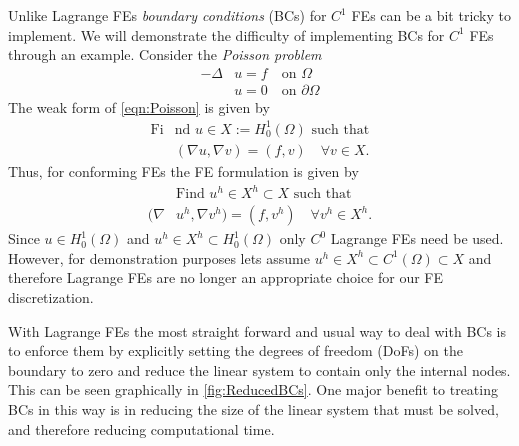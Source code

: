Unlike Lagrange FEs \emph{boundary conditions} (BCs) for $C^1$ FEs can be a bit
tricky to implement. We will demonstrate the difficulty of implementing BCs for
$C^1$ FEs through an example. Consider the \emph{Poisson problem}
\begin{equation}
  \begin{split}
    -\Delta &u = f \quad \text{on } \Omega \\
    &u = 0 \quad \text{on } \partial \Omega
  \end{split}
  \label{eqn:Poisson}
\end{equation}
The weak form of \eqref{eqn:Poisson} is given by
\begin{equation}
  \begin{split}
    \text{Fi}&\text{nd }u \in X := H^1_0(\Omega) \text{ such that} \\
    &(\nabla u, \nabla v) = (f, v) \quad \forall v \in X.
  \end{split}
  \label{eqn:PoissonWeak}
\end{equation}
Thus, for conforming FEs the FE formulation is given by
\begin{equation}
  \begin{split}
    &\text{Find }u^h \in X^h \subset X \text{ such that} \\
    (\nabla &u^h, \nabla v^h) = (f, v^h) \quad \forall v^h \in X^h.
  \end{split}
  \label{eqn:PoissonFE}
\end{equation}
Since $u \in H^1_0(\Omega)$ and $u^h \in X^h \subset H^1_0(\Omega)$ only $C^0$
Lagrange FEs need be used. However, for demonstration purposes lets assume $u^h
\in X^h \subset C^1(\Omega) \subset X$ and therefore Lagrange FEs are no longer
an appropriate choice for our FE discretization.

With Lagrange FEs the most straight forward and usual way to deal with BCs is to
enforce them by explicitly setting the degrees of freedom (DoFs) on the boundary
to zero and reduce the linear system to contain only the internal nodes. This
can be seen graphically in \autoref{fig:ReducedBCs}. One major benefit to
treating BCs in this way is in reducing the size of the linear system that must
be solved, and therefore reducing computational time.


